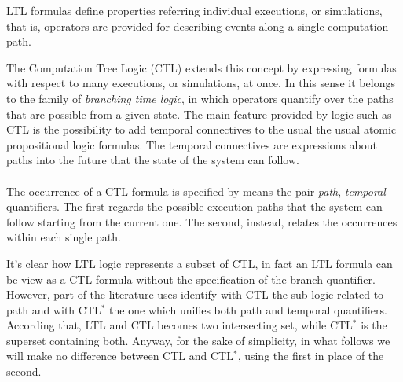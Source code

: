 LTL formulas define properties referring individual executions, or simulations, that is, operators are provided for describing events along a single computation path. 
\par The Computation Tree Logic (CTL) \citep{clarke2008design} extends this concept by expressing formulas with respect to many executions, or simulations, at once. In this sense it belongs to the family of  \textit{branching time logic}, in which operators quantify over the paths that are possible from a given state. The main feature provided by logic such as CTL is the possibility to add temporal connectives to the usual the usual atomic propositional logic formulas.  The temporal connectives are expressions about paths into the future that the state of the system can follow.
\paragraph{} The occurrence of a CTL formula is specified by means the pair \textit{path}, \textit{temporal} quantifiers. The first regards the possible execution paths that the system can follow starting from the current one. The second, instead, relates the occurrences within each single path. 
\par It's clear how LTL logic represents a subset of CTL, in fact an LTL formula can be view as a CTL formula without the specification of the branch quantifier. However, part of the literature uses identify with CTL the sub-logic related to path and with CTL$^*$ the one which unifies both path and temporal quantifiers. According that, LTL and CTL becomes two intersecting set, while CTL$^*$ is the superset containing both. Anyway, for the sake of simplicity, in what follows we will make no difference between CTL and CTL$^*$, using the first in place of the second.


